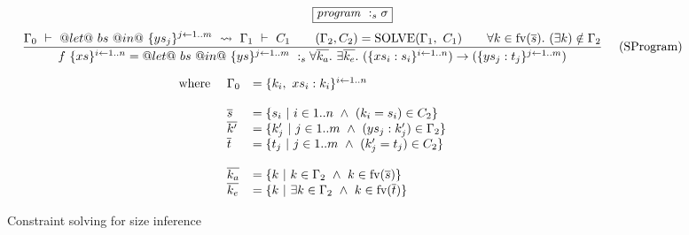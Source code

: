 
\newcommand\ins{\textit{ins}}
\newcommand\inty{\textit{inty}}
\begin{figure*}
\footnotesize
$$
\fbox{$
 \SizeF {\program}{\sigma}
$}
$$
$$
\ruleI  {
          \SizeL{\Gamma_0}
                {@let@~ bs~ @in@~ \{ ys_j \}^{j \gets 1 .. m}}
                {\Gamma_1}{C_1}
\qquad
  (\Gamma_2,C_2) = \textrm{SOLVE}(\Gamma_1,~ C_1)
  \qquad
          \forall k \in \textrm{fv}(\ov{s}).~
          (\exists k) \notin \Gamma_2
        }
        {
        \begin{array}{c}
        \SizeF{f~ \{xs\}^{i \gets 1..n}
                        = @let@~ bs~ @in@~ \{ys\}^{j \gets 1..m}
                }
                { \forall \overline{k_a}.~ 
                  \exists \overline{k_e}.~
                        (\{ xs_i : s_i \}^{i \gets 1..n}) \to
                        (\{ ys_j : t_j \}^{j \gets 1..m})
                }
\\[1em]
\begin{array}{lll}
\mbox{where }
  & \Gamma_0 & = \{k_i,~ xs_i : k_i \}^{ i \gets 1 .. n }
\\
\\
  & \ov{s} & = \{ s_i ~|~ i \in 1..n  ~\wedge~ (k_i = s_i) \in C_2 \}
\\
 & \ov{k'} & = \{ k'_j ~|~ j \in 1..m ~\wedge~ (ys_j : k_j') \in \Gamma_2 \}
\\
  & \ov{t} & = \{ t_j ~|~ j \in 1..m  ~\wedge~ (k_j' = t_j ) \in C_2 \}
\\
\\
 & \ov{k_a} & = \{ k ~|~ k         \in \Gamma_2 ~\wedge~ k \in \textrm{fv}(\ov{s}) \}  
\\
 & \ov{k_e} & = \{ k ~|~ \exists k \in \Gamma_2 ~\wedge~ k \in \textrm{fv}(\ov{t}) \}
\end{array}
\end{array}
        }
\quad
\textrm{(SProgram)}
$$

\caption{Constraint solving for size inference}
\label{clustering:f:ConstraintSolving}
\end{figure*}

